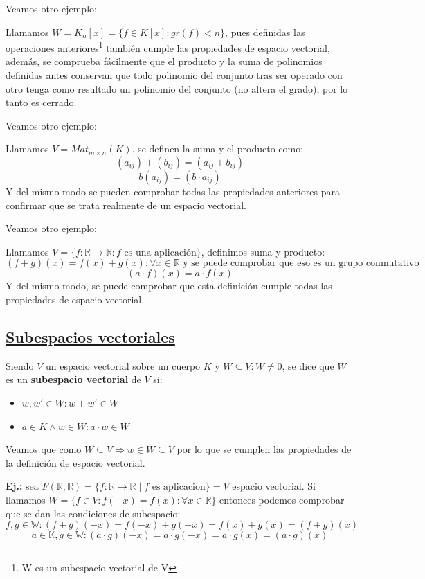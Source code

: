 \documentclass[10pt,a4paper,openright]{book}
\begin{document}
\vspace{0.35cm}

Veamos otro ejemplo:\par
Llamamos $W=K_n[x]=\{f\in K[x]: gr(f)<n\}$, pues definidas las operaciones anteriores\footnote{W es un subespacio vectorial de V} también cumple las propiedades de espacio vectorial, además, se comprueba fácilmente que el producto y la suma de polinomios definidas antes conservan que todo polinomio del conjunto tras ser operado con otro tenga como resultado un polinomio del conjunto (no altera el grado), por lo tanto es cerrado.\par

\vspace{0.35cm}

Veamos otro ejemplo:\par
Llamamos $V=Mat_{m\times n}(K)$, se definen la suma y el producto como:
$$(a_{ij})+(b_{ij})=(a_{ij}+b_{ij})$$
$$b(a_{ij})=(b\cdot a_{ij})$$
Y del mismo modo se pueden comprobar todas las propiedades anteriores para confirmar que se trata realmente de un espacio vectorial.

Veamos otro ejemplo:\par
Llamamos $V=\{f: \mathbb R\rightarrow \mathbb R: f \mbox{ es una aplicación}\}$, definimos suma y producto:
$$(f+g)(x)=f(x)+g(x):\forall x \in \mathbb R\mbox{ y se puede comprobar que eso es un grupo conmutativo}$$
$$(a\cdot f)(x)=a\cdot f(x)$$
Y del mismo modo, se puede comprobar que esta definición cumple todas las propiedades de espacio vectorial.

\subsection*{\underline{Subespacios vectoriales}}
Siendo $V$ un espacio vectorial sobre un cuerpo $K$ y $W\subseteq V: W\neq 0$, se dice que $W$ es un \textbf{subespacio vectorial} de $V$ si:

\begin{itemize}
\item $w, w'\in W: w+w'\in W$

\item $a\in K\wedge w\in W: a\cdot w\in W$
\end{itemize}

Veamos que como $W\subseteq V \Rightarrow w\in W\subseteq V$ por lo que se cumplen las propiedades de la definición de espacio vectorial.\par

\textbf{Ej.:} sea $F(\mathbb R, \mathbb R)=\{f:\mathbb R\rightarrow \mathbb R \mid f\mbox{ es aplicacion}\}=V$ espacio vectorial. Si llamamos $W=\{f\in V: f(-x)=f(x): \forall x \in \mathbb R\}$ entonces podemos comprobar que se dan las condiciones de subespacio:
$$f,g\in\mathbb W: (f+g)(-x)=f(-x)+g(-x)=f(x)+g(x)=(f+g)(x)$$
$$a\in \mathbb K, g\in\mathbb W: (a\cdot g)(-x)=a\cdot g(-x)=a\cdot g(x)=(a\cdot g)(x)$$
\end{document}
